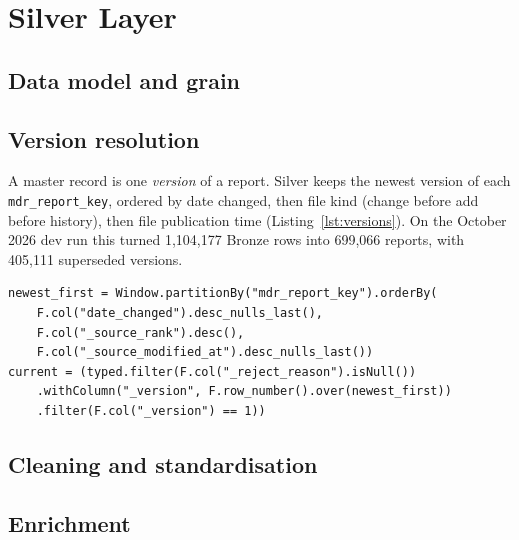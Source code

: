 \section{Silver Layer}
\label{sec:silver}


\subsection{Data model and grain}


\subsection{Version resolution}

A master record is one \emph{version} of a report. Silver keeps the newest version of each
\texttt{mdr\_report\_key}, ordered by date changed, then file kind (change before add before
history), then file publication time (Listing~\ref{lst:versions}). On the October 2026 dev run
this turned 1{,}104{,}177 Bronze rows into 699{,}066 reports, with 405{,}111 superseded
versions.

\begin{lstlisting}[caption={Newest version per report.},label={lst:versions}]
newest_first = Window.partitionBy("mdr_report_key").orderBy(
    F.col("date_changed").desc_nulls_last(),
    F.col("_source_rank").desc(),
    F.col("_source_modified_at").desc_nulls_last())
current = (typed.filter(F.col("_reject_reason").isNull())
    .withColumn("_version", F.row_number().over(newest_first))
    .filter(F.col("_version") == 1))
\end{lstlisting}

\subsection{Cleaning and standardisation}


\subsection{Enrichment}

